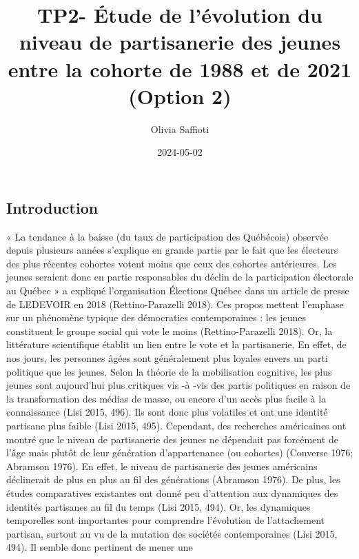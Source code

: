 \documentclass[
  letterpaper,
  DIV=11,
  numbers=noendperiod]{scrartcl}
\title{TP2- Étude de l'évolution du niveau de partisanerie des jeunes
entre la cohorte de 1988 et de 2021 (Option 2)}
\author{Olivia Saffioti}
\date{2024-05-02}
\begin{document}
\maketitle
\ifdefined\Shaded\renewenvironment{Shaded}{\begin{tcolorbox}[frame hidden, sharp corners, breakable, interior hidden, enhanced, boxrule=0pt, borderline west={3pt}{0pt}{shadecolor}]}{\end{tcolorbox}}\fi

\hypertarget{introduction}{%
\subsection{Introduction}\label{introduction}}

« La tendance à la baisse (du taux de participation des Québécois)
observée depuis plusieurs années s'explique en grande partie par le fait
que les électeurs des plus récentes cohortes votent moins que ceux des
cohortes antérieures. Les jeunes seraient donc en partie responsables du
déclin de la participation électorale au Québec » a expliqué
l'organisation Élections Québec dans un article de presse de LEDEVOIR en
2018 (Rettino-Parazelli 2018). Ces propos mettent l'emphase sur un
phénomène typique des démocraties contemporaines : les jeunes
constituent le groupe social qui vote le moins (Rettino-Parazelli 2018).
Or, la littérature scientifique établit un lien entre le vote et la
partisanerie. En effet, de nos jours, les personnes âgées sont
généralement plus loyales envers un parti politique que les jeunes.
Selon la théorie de la mobilisation cognitive, les plus jeunes sont
aujourd'hui plus critiques vis -à -vis des partis politiques en raison
de la transformation des médias de masse, ou encore d'un accès plus
facile à la connaissance (Lisi 2015, 496). Ils sont donc plus volatiles
et ont une identité partisane plus faible (Lisi 2015, 495). Cependant,
des recherches américaines ont montré que le niveau de partisanerie des
jeunes ne dépendait pas forcément de l'âge mais plutôt de leur
génération d'appartenance (ou cohortes) (Converse 1976; Abramson 1976).
En effet, le niveau de partisanerie des jeunes américains déclinerait de
plus en plus au fil des générations (Abramson 1976). De plus, les études
comparatives existantes ont donné peu d'attention aux dynamiques des
identités partisanes au fil du temps (Lisi 2015, 494). Or, les
dynamiques temporelles sont importantes pour comprendre l'évolution de
l'attachement partisan, surtout au vu de la mutation des sociétés
contemporaines (Lisi 2015, 494). Il semble donc pertinent de mener une
\end{document}
